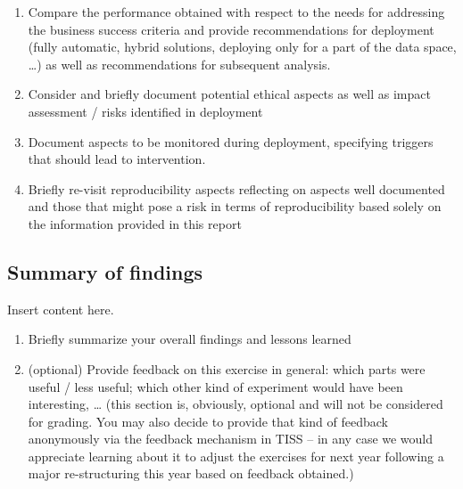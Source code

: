 \documentclass[sigchi]{acmart}
\def\tightlist{}
\begin{document}
\begin{enumerate}
\def\labelenumi{\alph{enumi}.}
\tightlist
\item
  Compare the performance obtained with respect to the needs for addressing the business success criteria and provide recommendations for deployment (fully automatic, hybrid solutions, deploying only for a part of the data space, \ldots) as well as recommendations for subsequent analysis.
\item
  Consider and briefly document potential ethical aspects as well as impact assessment / risks identified in deployment
\item
  Document aspects to be monitored during deployment, specifying triggers that should lead to intervention.
\item
  Briefly re-visit reproducibility aspects reflecting on aspects well documented and those that might pose a risk in terms of reproducibility based solely on the information provided in this report
\end{enumerate}

\hypertarget{summary-of-findings}{%
\subsection{Summary of findings}\label{summary-of-findings}}

Insert content here.

\begin{enumerate}
\def\labelenumi{\alph{enumi}.}
\tightlist
\item
  Briefly summarize your overall findings and lessons learned
\item
  (optional) Provide feedback on this exercise in general: which parts were useful / less useful; which other kind of experiment would have been interesting, \ldots{} (this section is, obviously, optional and will not be considered for grading. You may also decide to provide that kind of feedback anonymously via the feedback mechanism in TISS -- in any case we would appreciate learning about it to adjust the exercises for next year following a major re-structuring this year based on feedback obtained.)
\end{enumerate}



\end{document}
